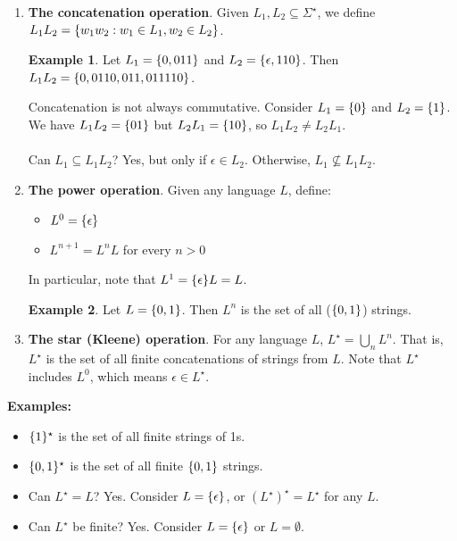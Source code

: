 \documentclass[]{article}
\DeclarePairedDelimiter{\set}{\lbrace}{\rbrace}
\theoremstyle{definition}
\newtheorem{ex}{Example}[section]
\begin{document}
          \begin{enumerate}
            \item \textbf{The concatenation operation}. Given $L_1, L_2 \subseteq \Sigma^\star$, we define $L_1 L_2 = \set{ w_1 w_2 : w_1 \in L_1, w_2 \in L_2 }$.

            \begin{ex}
            Let $L_1 = \set{0, 011}$ and $L_2 = \set{ \epsilon, 110 }$. Then $L_1 L_2 = \set{0, 0110, 011, 011110 }$.
            \end{ex}

            Concatenation is not always commutative. Consider $L_1 = \set{0}$ and $L_2 = \set{1}$. We have $L_1 L_2 = \set{01}$ but $L_2 L_1 = \set{10}$, so $L_1 L_2 \ne L_2 L_1$.
            \\ \\
            Can $L_1 \subseteq L_1 L_2$? Yes, but only if $\epsilon \in L_2$. Otherwise, $L_1 \not \subseteq L_1 L_2$.

            \item \textbf{The power operation}. Given any language $L$, define:
              \begin{itemize}
                \item $L^0 = \set{ \epsilon }$
                \item $L^{n + 1} = L^n L$ for every $n > 0$
              \end{itemize}

              In particular, note that $L^1 = \set{ \epsilon} L = L$.

              \begin{ex}
                Let $L = \set{ 0, 1 }$. Then $L^n$ is the set of all ($\set{0, 1}$) strings.
              \end{ex}

            \item \textbf{The star (Kleene) operation}. For any language $L$, $L^\star = \displaystyle \bigcup_n L^n$. That is, $L^\star$ is the set of all finite concatenations of strings from $L$. Note that $L^\star$ includes $L^0$, which means $\epsilon \in L^\star$.
          \end{enumerate}

          \noindent \textbf{Examples:}
            \begin{itemize}
              \item $\set{1}^\star$ is the set of all finite strings of 1s.
              \item $\set{0, 1}^\star$ is the set of all finite $\set{0, 1}$ strings.
              \item Can $L^\star = L$? Yes. Consider $L = \set{ \epsilon }$, or $(L^\star)^\star = L^\star$ for any $L$.
              \item Can $L^\star$ be finite? Yes. Consider $L = \set{ \epsilon }$ or $L = \emptyset$.
            \end{itemize}
\end{document}
